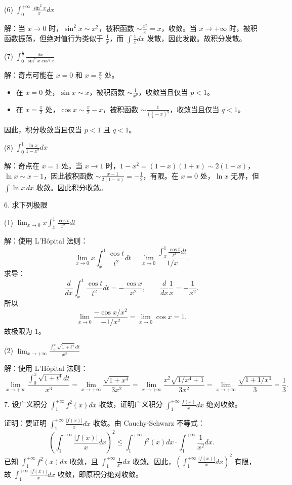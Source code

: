 (6) \(\int_{0}^{+\infty}\frac{\sin^{2}x}{x}dx\)

解：当 \(x\to0\) 时，\(\sin^{2}x\sim x^{2}\)，被积函数 \(\sim\frac{x^{2}}{x}=x\)，收敛。当 \(x\to+\infty\) 时，被积函数振荡，但绝对值行为类似于 \(\frac{1}{x}\)，而 \(\int\frac{1}{x}dx\) 发散，因此发散。故积分发散。

(7) \(\int_{0}^{\frac{\pi}{2}}\frac{dx}{\sin^{p}x\cos^{q}x}\)

解：奇点可能在 \(x=0\) 和 \(x=\frac{\pi}{2}\) 处。
\begin{itemize}
\item 在 \(x=0\) 处，\(\sin x\sim x\)，被积函数 \(\sim\frac{1}{x^{p}}\)，收敛当且仅当 \(p<1\)。
\item 在 \(x=\frac{\pi}{2}\) 处，\(\cos x\sim\frac{\pi}{2}-x\)，被积函数 \(\sim\frac{1}{\left(\frac{\pi}{2}-x\right)^{q}}\)，收敛当且仅当 \(q<1\)。
\end{itemize}
因此，积分收敛当且仅当 \(p<1\) 且 \(q<1\)。

(8) \(\int_{0}^{1}\frac{\ln x}{1-x^{2}}dx\)

解：奇点在 \(x=1\) 处。当 \(x\to1\) 时，\(1-x^{2}=(1-x)(1+x)\sim2(1-x)\)，\(\ln x\sim x-1\)，因此被积函数 \(\sim\frac{x-1}{2(1-x)}=-\frac{1}{2}\)，有限。在 \(x=0\) 处，\(\ln x\) 无界，但 \(\int\ln x\,dx\) 收敛。因此积分收敛。

6. 求下列极限

(1) \(\lim_{x\to0}x\int_{x}^{1}\frac{\cos t}{t^{2}}dt\)

解：使用 L'Hôpital 法则：
\[ \lim_{x\to0}x\int_{x}^{1}\frac{\cos t}{t^{2}}dt=\lim_{x\to0}\frac{\int_{x}^{1}\frac{\cos t}{t^{2}}dt}{1/x}. \]
求导：
\[ \frac{d}{dx}\int_{x}^{1}\frac{\cos t}{t^{2}}dt=-\frac{\cos x}{x^{2}},\qquad \frac{d}{dx}\frac{1}{x}=-\frac{1}{x^{2}}. \]
所以
\[ \lim_{x\to0}\frac{-\cos x/x^{2}}{-1/x^{2}}=\lim_{x\to0}\cos x=1. \]
故极限为 \(1\)。

(2) \(\lim_{x\to+\infty}\frac{\int_{0}^{x}\sqrt{1+t^{4}}\,dt}{x^{3}}\)

解：使用 L'Hôpital 法则：
\[ \lim_{x\to+\infty}\frac{\int_{0}^{x}\sqrt{1+t^{4}}dt}{x^{3}}=\lim_{x\to+\infty}\frac{\sqrt{1+x^{4}}}{3x^{2}}=\lim_{x\to+\infty}\frac{x^{2}\sqrt{1/x^{4}+1}}{3x^{2}}=\lim_{x\to+\infty}\frac{\sqrt{1+1/x^{4}}}{3}=\frac{1}{3}. \]

7. 设广义积分 \(\int_{1}^{+\infty}f^{2}(x)dx\) 收敛，证明广义积分 \(\int_{1}^{+\infty}\frac{f(x)}{x}dx\) 绝对收敛。

证明：要证明 \(\int_{1}^{+\infty}\frac{|f(x)|}{x}dx\) 收敛。由 Cauchy-Schwarz 不等式：
\[ \left(\int_{1}^{+\infty}\frac{|f(x)|}{x}dx\right)^{2}\le\int_{1}^{+\infty}f^{2}(x)dx\cdot\int_{1}^{+\infty}\frac{1}{x^{2}}dx. \]
已知 \(\int_{1}^{+\infty}f^{2}(x)dx\) 收敛，且 \(\int_{1}^{+\infty}\frac{1}{x^{2}}dx\) 收敛。因此，\(\left(\int_{1}^{+\infty}\frac{|f(x)|}{x}dx\right)^{2}\) 有限，故 \(\int_{1}^{+\infty}\frac{|f(x)|}{x}dx\) 收敛，即原积分绝对收敛。
